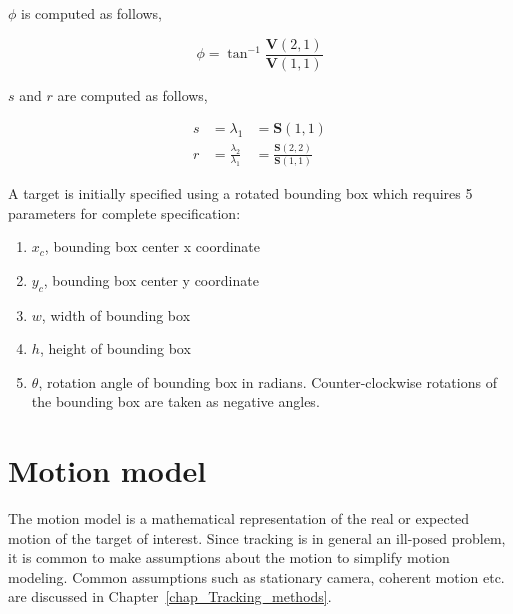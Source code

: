 $\phi$ is computed as follows,

\begin{equation*}
\phi = \tan^{-1}\frac{\mathbf{V}(2,1)}{\mathbf{V}(1,1)}
\end{equation*}

$s$ and $r$ are computed as follows,

\begin{equation}
\begin{array}{llll}
s &= \lambda_1 &=  \mathbf{S}(1,1)\\
r &= \frac{\lambda_2}{\lambda_1} &= \frac{\mathbf{S}(2,2)}{\mathbf{S}(1,1)}
\end{array}
\end{equation}


A target is initially specified using a rotated bounding box which requires 5 parameters for complete specification:

\begin{enumerate}
\item $x_c$, bounding box center x coordinate
\item $y_c$, bounding box center y coordinate
\item $w$, width of bounding box
\item $h$, height of bounding box
\item $\theta$, rotation angle of bounding box in radians.  Counter-clockwise rotations of the bounding box are taken as negative angles.  
\end{enumerate}



\section{Motion model}
The motion model is a mathematical representation of the real or expected motion of the target of interest.  Since tracking is in general an ill-posed problem, it is common to make assumptions about the motion to simplify motion modeling.  Common assumptions such as stationary camera, coherent motion etc. are discussed in Chapter~\ref{chap_Tracking_methods}.

